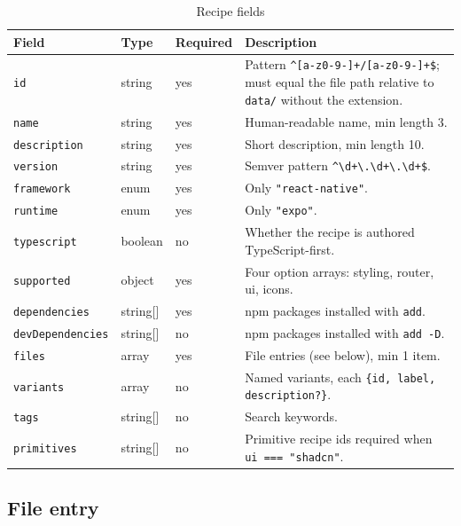 \begin{longtable}{p{2.7cm}p{2.1cm}p{2cm}p{7.2cm}}
\caption{Recipe fields}\\
\toprule
\textbf{Field} & \textbf{Type} & \textbf{Required} & \textbf{Description} \\
\midrule

\texttt{id} & string & yes & Pattern \texttt{\^{}[a-z0-9-]+/[a-z0-9-]+\$}; must equal the
file path relative to \texttt{data/} without the extension. \\
\texttt{name} & string & yes & Human-readable name, min length 3. \\
\texttt{description} & string & yes & Short description, min length 10. \\
\texttt{version} & string & yes & Semver pattern \texttt{\^{}\textbackslash d+\textbackslash.\textbackslash d+\textbackslash.\textbackslash d+\$}. \\
\texttt{framework} & enum & yes & Only \texttt{"react-native"}. \\
\texttt{runtime} & enum & yes & Only \texttt{"expo"}. \\
\texttt{typescript} & boolean & no & Whether the recipe is authored TypeScript-first. \\
\texttt{supported} & object & yes & Four option arrays: styling, router, ui, icons. \\
\texttt{dependencies} & string[] & yes & npm packages installed with \texttt{add}. \\
\texttt{devDependencies} & string[] & no & npm packages installed with \texttt{add -D}. \\
\texttt{files} & array & yes & File entries (see below), min 1 item. \\
\texttt{variants} & array & no & Named variants, each \texttt{\{id, label, description?\}}. \\
\texttt{tags} & string[] & no & Search keywords. \\
\texttt{primitives} & string[] & no & Primitive recipe ids required when
\texttt{ui === "shadcn"}. \\
\bottomrule
\end{longtable}

\subsection*{File entry}


